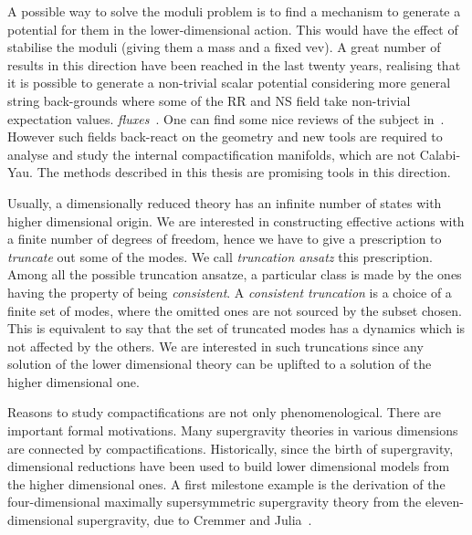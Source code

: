 \documentclass[draft]{phd}
\begin{document}
 A possible way to solve the moduli problem is to find a mechanism to generate a potential  for them in the lower-dimensional action.
This would have the effect of stabilise the moduli (giving them a mass and a fixed vev).
A great number of results in this direction have been reached in the last twenty years, realising that it is possible to generate a non-trivial scalar potential 
considering more general string back-grounds where some of the RR and NS field take non-trivial expectation values. \emph{fluxes}~\cite{fluxcomp1, fluxcomp2, fluxcomp3}.
One can find some nice reviews of the subject in~\cite{DuffReviewComp, MarianaFluxReview, LustReviewComp, henlect}.
 However such fields back-react on the geometry and new tools are required to analyse and study the internal compactification manifolds, which are not Calabi-Yau.
 The methods described in this thesis are promising tools in this direction.
 
 Usually, a dimensionally reduced theory has an infinite number of states with higher dimensional origin.
 We are interested in constructing effective actions with a finite number of degrees of freedom, hence we have to give a prescription to \emph{truncate} out some of the modes.
 We call \emph{truncation ansatz} this prescription.
 Among all the possible truncation ansatze, a particular class is made by the ones having the property of being \emph{consistent}.
 A \emph{consistent truncation} is a choice of a finite set of modes, where the omitted ones are not sourced by the subset chosen. 
 This is equivalent to say that the set of truncated modes has a dynamics which is not affected by the others.
 We are interested in such truncations since any solution of the lower dimensional theory can be uplifted to a solution of the higher dimensional one.

		
		Reasons to study compactifications are not only phenomenological.
		There are important formal motivations.
		Many supergravity theories in various dimensions are connected by compactifications.
		Historically, since the birth of supergravity, dimensional reductions have been used to build lower dimensional models from the higher dimensional ones.		
		A first milestone example is the derivation of the four-dimensional maximally supersymmetric supergravity theory from the eleven-dimensional supergravity, due to Cremmer and Julia~\cite{CremmerJulia}.
		
\end{document}
